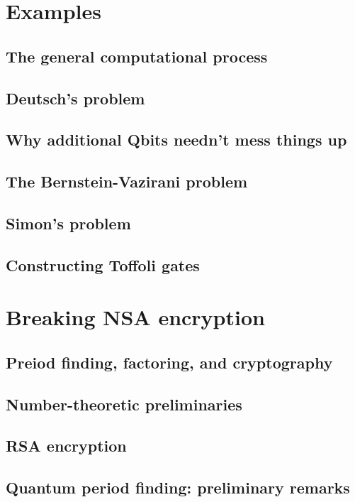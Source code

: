\documentclass{book}
\theoremstyle{definition}
\begin{document}
\newpage



\section{Examples}


\subsection{The general computational process}
\subsection{Deutsch's problem}
\subsection{Why additional Qbits needn't mess things up}
\subsection{The Bernstein-Vazirani problem}
\subsection{Simon's problem}
\subsection{Constructing Toffoli gates}


\newpage


\section{Breaking NSA encryption}

\subsection{Preiod finding, factoring, and cryptography}
\subsection{Number-theoretic preliminaries}
\subsection{RSA encryption}
\subsection{Quantum period finding: preliminary remarks}
\end{document}

